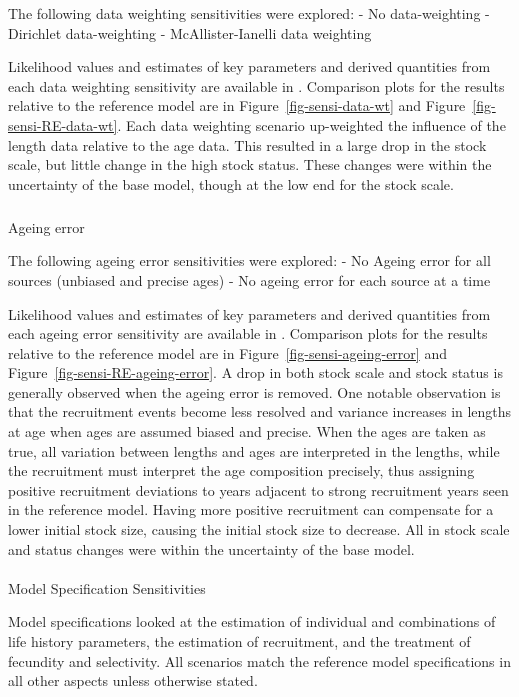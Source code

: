 \documentclass[
]{scrartcl}
\makeatletter
\let\oldparagraph\paragraph
\renewcommand{\paragraph}{
    \@ifstar
      \xxxParagraphStar
      \xxxParagraphNoStar
  }
\newcommand{\xxxParagraphStar}[1]{\oldparagraph*{#1}\mbox{}}
\newcommand{\xxxParagraphNoStar}[1]{\oldparagraph{#1}\mbox{}}
\let\oldsubparagraph\subparagraph
\renewcommand{\subparagraph}{
    \@ifstar
      \xxxSubParagraphStar
      \xxxSubParagraphNoStar
  }
\newcommand{\xxxSubParagraphStar}[1]{\oldsubparagraph*{#1}\mbox{}}
\newcommand{\xxxSubParagraphNoStar}[1]{\oldsubparagraph{#1}\mbox{}}
\makeatother
\begin{document}
The following data weighting sensitivities were explored: - No
data-weighting - Dirichlet data-weighting - McAllister-Ianelli data
weighting

Likelihood values and estimates of key parameters and derived quantities
from each data weighting sensitivity are available in . Comparison plots
for the results relative to the reference model are in
Figure~\ref{fig-sensi-data-wt} and Figure~\ref{fig-sensi-RE-data-wt}.
Each data weighting scenario up-weighted the influence of the length
data relative to the age data. This resulted in a large drop in the
stock scale, but little change in the high stock status. These changes
were within the uncertainty of the base model, though at the low end for
the stock scale.

\subparagraph{Ageing error}\label{ageing-error}

The following ageing error sensitivities were explored: - No Ageing
error for all sources (unbiased and precise ages) - No ageing error for
each source at a time

Likelihood values and estimates of key parameters and derived quantities
from each ageing error sensitivity are available in . Comparison plots
for the results relative to the reference model are in
Figure~\ref{fig-sensi-ageing-error} and
Figure~\ref{fig-sensi-RE-ageing-error}. A drop in both stock scale and
stock status is generally observed when the ageing error is removed. One
notable observation is that the recruitment events become less resolved
and variance increases in lengths at age when ages are assumed biased
and precise. When the ages are taken as true, all variation between
lengths and ages are interpreted in the lengths, while the recruitment
must interpret the age composition precisely, thus assigning positive
recruitment deviations to years adjacent to strong recruitment years
seen in the reference model. Having more positive recruitment can
compensate for a lower initial stock size, causing the initial stock
size to decrease. All in stock scale and status changes were within the
uncertainty of the base model.

\paragraph{Model Specification Sensitivities}\label{senstivities}

Model specifications looked at the estimation of individual and
combinations of life history parameters, the estimation of recruitment,
and the treatment of fecundity and selectivity. All scenarios match the
reference model specifications in all other aspects unless otherwise
stated.
\end{document}
